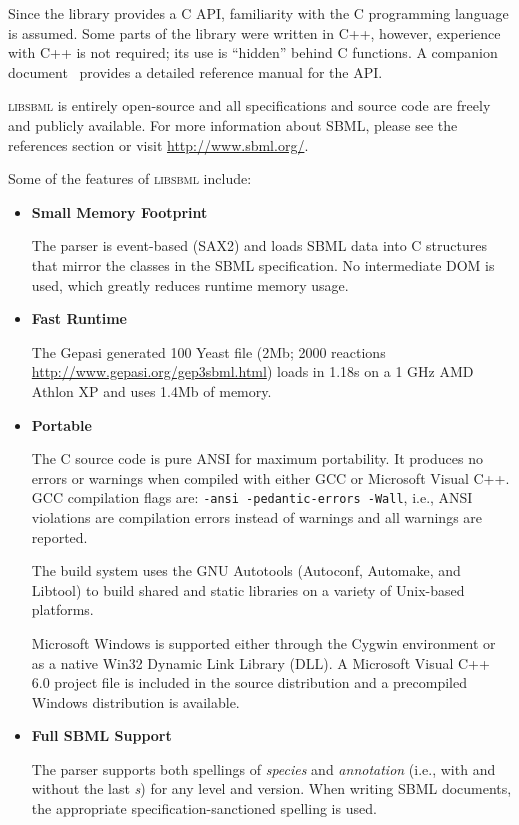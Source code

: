 \documentclass{cekmanual}
\newcommand{\libsbml}{\textsc{libsbml}}
\begin{document}
Since the library provides a C API, familiarity with the C programming
language is assumed.  Some parts of the library were written in C++,
however, experience with C++ is not required; its use is ``hidden''
behind C functions.  A companion document~\citep{bornstein:2003b} provides
a detailed reference manual for the API.

\libsbml{} is entirely open-source and all specifications and
source code are freely and publicly available.  For more information
about SBML, please see the references section or visit
\url{http://www.sbml.org/}.

Some of the features of \textsc{libsbml} include:


\begin{itemize}

  \item \textbf{Small Memory Footprint}

  The parser is event-based (SAX2) and loads SBML data into C
  structures that mirror the classes in the SBML specification.  No
  intermediate DOM is used, which greatly reduces runtime memory
  usage.

  \item \textbf{Fast Runtime}

  The Gepasi generated 100 Yeast file (2Mb; 2000 reactions
  \url{http://www.gepasi.org/gep3sbml.html}) loads in 1.18s on a 1 GHz
  AMD Athlon XP and uses 1.4Mb of memory.

  \item \textbf{Portable}

  The C source code is pure ANSI for maximum portability.  It produces
  no errors or warnings when compiled with either GCC or Microsoft
  Visual C++.  GCC compilation flags are: \texttt{-ansi
  -pedantic-errors -Wall}, i.e., ANSI violations are compilation errors
  instead of warnings and all warnings are reported.

  The build system uses the GNU Autotools (Autoconf, Automake, and
  Libtool) to build shared and static libraries on a variety of
  Unix-based platforms.

  Microsoft Windows is supported either through the Cygwin environment
  or as a native Win32 Dynamic Link Library (DLL).  A Microsoft Visual
  C++ 6.0 project file is included in the source distribution and a
  precompiled Windows distribution is available.

  \item \textbf{Full SBML Support}

  The parser supports both spellings of \emph{species} and
  \emph{annotation} (i.e., with and without the last \emph{s}) for any
  level and version.  When writing SBML documents, the appropriate
  specification-sanctioned spelling is used.


\end{itemize}
\end{document}

